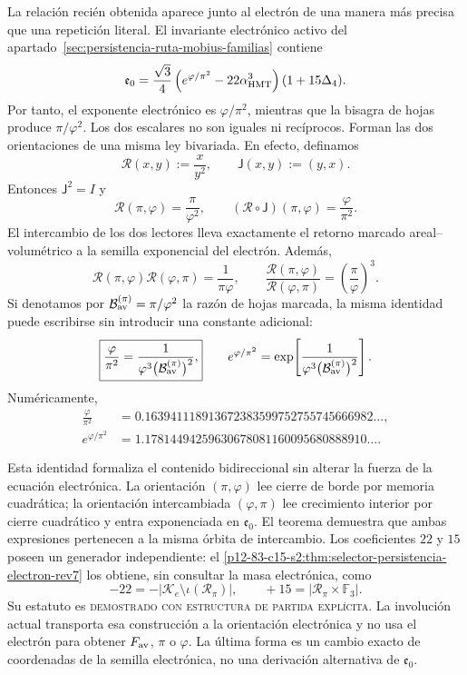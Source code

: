 La relación recién obtenida aparece junto al electrón de una manera más
precisa que una repetición literal. El invariante electrónico activo del
apartado~\ref{sec:persistencia-ruta-mobius-familias} contiene
\[
 \mathfrak e_0=
 \frac{\sqrt3}{4}
 \left(e^{\varphi/\pi^2}-22\alpha_{\rm HMT}^{3}\right)
 (1+15\Delta_4).
\]
Por tanto, el exponente electrónico es \(\varphi/\pi^2\), mientras que la
bisagra de hojas produce \(\pi/\varphi^2\). Los dos escalares no son
iguales ni recíprocos. Forman las dos orientaciones de una misma ley
bivariada. En efecto, definamos
\[
 \mathscr R(x,y):=\frac{x}{y^2},
 \qquad
 \mathsf J(x,y):=(y,x).
\]
Entonces \(\mathsf J^2=I\) y
\[
 \boxed{
 \mathscr R(\pi,\varphi)=\frac{\pi}{\varphi^2},
 \qquad
 (\mathscr R\circ\mathsf J)(\pi,\varphi)
 =\frac{\varphi}{\pi^2}.}
\]
El intercambio de los dos lectores lleva exactamente el retorno marcado
areal--volumétrico a la semilla exponencial del electrón. Además,
\[
 \mathscr R(\pi,\varphi)\mathscr R(\varphi,\pi)
 =\frac1{\pi\varphi},
 \qquad
 \frac{\mathscr R(\pi,\varphi)}
 {\mathscr R(\varphi,\pi)}
 =\left(\frac{\pi}{\varphi}\right)^3.
\]
Si denotamos por
\(\mathcal B_{\rm av}^{(\pi)}=\pi/\varphi^2\) la razón de hojas
marcada, la misma identidad puede escribirse sin introducir una constante
adicional:
\[
 \boxed{
 \frac{\varphi}{\pi^2}
 =
 \frac{1}
 {\varphi^3\bigl(\mathcal B_{\rm av}^{(\pi)}\bigr)^2},}
 \qquad
 e^{\varphi/\pi^2}
 =
 \exp\!\left[
 \frac{1}
 {\varphi^3\bigl(\mathcal B_{\rm av}^{(\pi)}\bigr)^2}
 \right].
\]
Numéricamente,
\[
 \begin{aligned}
 \frac{\varphi}{\pi^2}
 &=0.163941118913672383599752755745666982\ldots,\\
 e^{\varphi/\pi^2}
 &=1.17814494259630678081160095680888910\ldots.
 \end{aligned}
\]

Esta identidad formaliza el contenido bidireccional sin alterar la fuerza de la
ecuación electrónica. La orientación \((\pi,\varphi)\) lee cierre de borde
por memoria cuadrática; la orientación intercambiada
\((\varphi,\pi)\) lee crecimiento interior por cierre cuadrático y entra
exponenciada en \(\mathfrak e_0\). El teorema demuestra que ambas
expresiones pertenecen a la misma órbita de intercambio. Los coeficientes
\(22\) y \(15\) poseen un generador independiente: el
\cref{p12-83-c15-s2:thm:selector-persistencia-electron-rev7} los obtiene, sin consultar la
masa electrónica, como
\[
 -22=-\bigl|\mathcal K_e\setminus\iota(\mathscr R_\pi)\bigr|,
 \qquad
 +15=\bigl|\mathscr R_\pi\times\mathbb F_3\bigr|.
\]
Su estatuto es \textsc{demostrado con estructura de partida explícita}. La
involución actual transporta esa construcción a la orientación electrónica y
no usa el electrón para obtener \(F_{\rm av}\), \(\pi\) o \(\varphi\). La
última forma es un cambio exacto de coordenadas de la semilla electrónica, no
una derivación alternativa de \(\mathfrak e_0\).

